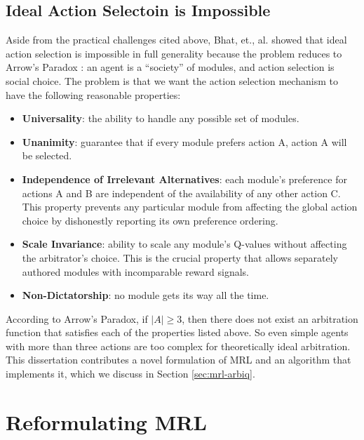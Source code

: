 \subsection{Ideal Action Selectoin is Impossible}

Aside from the practical challenges cited above, Bhat, et., al.  \cite{bhat2006on-the-difficulty} showed that ideal action selection is impossible in full generality because the problem reduces to Arrow's Paradox \cite{arrow1963social}: an agent is a ``society'' of modules, and action selection is social choice.  The problem is that we want the action selection mechanism to have the following reasonable properties:

\begin{itemize}

\item \textbf{Universality}: the ability to handle any possible set of modules.

\item \textbf{Unanimity}: guarantee that if every module prefers action A, action A will be selected.

\item \textbf{Independence of Irrelevant Alternatives}: each module's preference for actions A and B are independent of the availability of any other action C. This property prevents any particular module from affecting the global action choice by dishonestly reporting its own preference ordering.

\item \textbf{Scale Invariance}: ability to scale any module's Q-values without affecting the arbitrator's choice.  This is the crucial property that allows separately authored modules with incomparable reward signals.

\item \textbf{Non-Dictatorship}: no module gets its way all the time.

\end{itemize}

\cite{roberts1980interpersonal}

According to Arrow's Paradox, if $|A|\geq 3$, then there does not exist an arbitration function that satisfies each of the properties listed above.  So even simple agents with more than three actions are too complex for theoretically ideal arbitration.  This dissertation contributes a novel formulation of MRL and an algorithm that implements it, which we discuss in Section \ref{sec:mrl-arbiq}.

\section{Reformulating MRL}\label{sec:mrl-solution}

